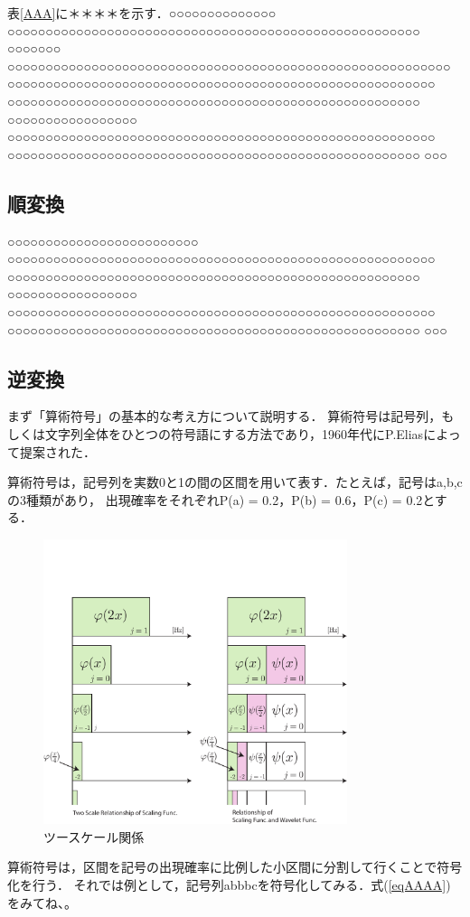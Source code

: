 表\ref{AAA}に＊＊＊＊を示す．○○○○○○○○○○○○○○ ○○○○○○○○○○○○○○○○○○○○○○○○○○○○○○○○○○○○○○○○○○○○○○○○○○○○○○ ○○○○○○○ ○○○○○○○○○○○○○○○○○○○○○○○○○○○○○○○○○○○○○○○○○○○○○○○○○○○○○○○○○○ ○○○○○○○○○○○○○○○○○○○○○○○○○○○○○○○○○○○○○○○○○○○○○○○○○○○○○○○○ ○○○○○○○○○○○○○○○○○○○○○○○○○○○○○○○○○○○○○○○○○○○○○○○○○○○○○○ ○○○○○○○○○○○○○○○○○ ○○○○○○○○○○○○○○○○○○○○○○○○○○○○○○○○○○○○○○○○○○○○○○○○○○○○○○○○ ○○○○○○○○○○○○○○○○○○○○○○○○○○○○○○○○○○○○○○○○○○○○○○○○○○○○○○ ○○○
\subsection{順変換}\label{QWERT}
○○○○○○○○○○○○○○○○○○○○○○○○○ ○○○○○○○○○○○○○○○○○○○○○○○○○○○○○○○○○○○○○○○○○○○○○○○○○○○○○○○○ ○○○○○○○○○○○○○○○○○○○○○○○○○○○○○○○○○○○○○○○○○○○○○○○○○○○○○○ ○○○○○○○○○○○○○○○○○ ○○○○○○○○○○○○○○○○○○○○○○○○○○○○○○○○○○○○○○○○○○○○○○○○○○○○○○○○ ○○○○○○○○○○○○○○○○○○○○○○○○○○○○○○○○○○○○○○○○○○○○○○○○○○○○○○ ○○○
\subsection{逆変換}\label{QWERT}
まず「算術符号」の基本的な考え方について説明する．
算術符号は記号列，もしくは文字列全体をひとつの符号語にする方法であり，1960年代にP.Eliasによって提案された．\par
算術符号は，記号列を実数0と1の間の区間を用いて表す．たとえば，記号は{a,b,c}の3種類があり，
出現確率をそれぞれP(a) = 0.2，P(b) = 0.6，P(c) = 0.2とする．
\begin{figure}[htbp]
\begin{center}
\includegraphics[width=3.5in]{chap1/fig/two-scale.pdf}
\caption{ツースケール関係} \label{fig-two-scale.pdf}
\end{center}
\end{figure}
算術符号は，区間を記号の出現確率に比例した小区間に分割して行くことで符号化を行う．
それでは例として，記号列abbbcを符号化してみる．式(\ref{eqAAAA})をみてね、。

